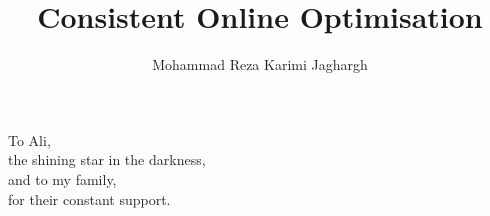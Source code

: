 \documentclass[11pt,a4paper]{amsbook}
\theoremstyle{definition}
\theoremstyle{remark}
\numberwithin{section}{chapter}
\numberwithin{equation}{chapter}
\begin{document}
\frontmatter


\setcounter{page}{0}
\clearpage\thispagestyle{empty}\mbox{}\clearpage
\title{Consistent Online Optimisation}
\author{Mohammad Reza Karimi Jaghargh}
\address{Learning and Adaptive Systems Group, Computer Science Department, ETH Z\"urich}
\maketitle

\cleardoublepage
\thispagestyle{empty}
\vspace*{13.5pc}
\begin{center}
    To Ali,\\[2pt]
    the shining star in the darkness,\\[2pt]
    and to my family,\\[2pt]
    for their constant support.
\end{center}
\cleardoublepage

\setcounter{page}{5}
\tableofcontents

\mainmatter








\appendix


\backmatter



\newpage

\end{document}
